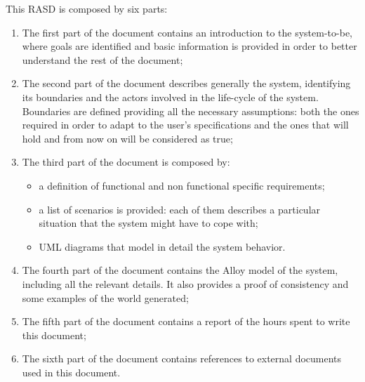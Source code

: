 This RASD is composed by six parts:
\begin{enumerate}
\item The first part of the document contains an introduction to the system-to-be, where goals are identified and basic information is provided in order to better understand the rest of the document;
\item The second part of the document describes generally the system, identifying its boundaries and the actors involved in the life-cycle of the system. Boundaries are defined providing all the necessary assumptions: both the ones required in order to adapt to the user's specifications and the ones that will hold and from now on will be considered as true;
\item The third part of the document is composed by:
	\begin{itemize}
	\item a definition of functional and non functional specific requirements;
	\item a list of scenarios is provided: each of them describes a particular situation that the system might have to cope with;
	\item UML diagrams that model in detail the system behavior.
	\end{itemize}
\item The fourth part of the document contains the Alloy model of the system, including all the relevant 
details. It also provides a proof of consistency and some examples of the world generated;
\item The fifth part of the document contains a report of the hours spent to write this document;
\item The sixth part of the document contains references to external documents used in this document.
\end{enumerate}
